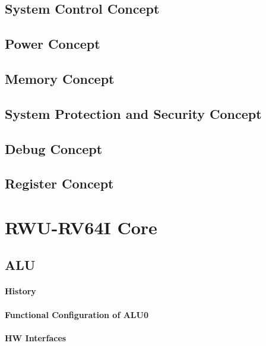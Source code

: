 \section{System Control Concept}

\section{Power Concept}

\section{Memory Concept}


\section{System Protection and Security Concept}

\section{Debug Concept}

\section{Register Concept}


\chapter{RWU-RV64I Core}
\section{ALU}
\label{sec:alufunc01}
\subsubsection{History}


\subsubsection{Functional Configuration of ALU0}


\subsubsection{HW Interfaces}


